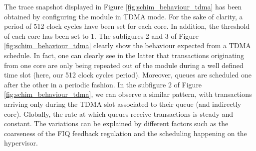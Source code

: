     The trace snapshot displayed in Figure \ref{fig:schim_behaviour_tdma} has been obtained by configuring the \schim module in TDMA mode. For the sake of clarity, a period of 512 clock cycles have been set for each core. In addition, the threshold of each core has been set to 1.
    The subfigures 2 and 3 of Figure \ref{fig:schim_behaviour_tdma} clearly show the behaviour expected from a TDMA schedule. In fact, one can clearly see in the latter that transactions originating from one core are only being repeated out of the \schim module during a well defined time slot (here, our 512 clock cycles period). Moreover, queues are scheduled one after the other in a periodic fashion.
    In the subfigure 2 of Figure \ref{fig:schim_behaviour_tdma}, we can observe a similar pattern, with transactions arriving only during the TDMA slot associated to their queue (and indirectly core). Globally, the rate at which queues receive transactions is steady and constant. The variations can be explained by different factors such as the coarseness of the FIQ feedback regulation and the scheduling happening on the hypervisor.
    
